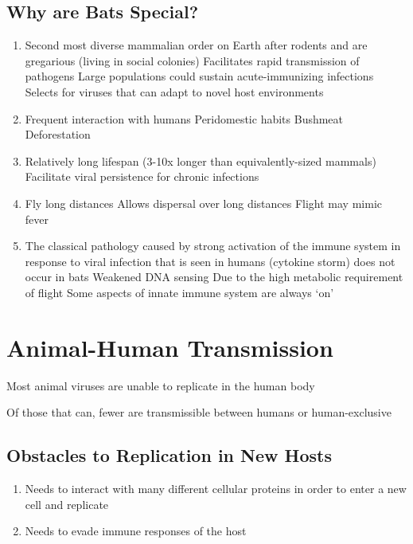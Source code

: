 \documentclass{notes}
\begin{document}
\subsection{Why are Bats Special?}

\begin{enumerate}
    \item Second most diverse mammalian order on Earth after rodents and are gregarious (living in social colonies)
    \subitem Facilitates rapid transmission of pathogens
    \subitem Large populations could sustain acute-immunizing infections
    \subitem Selects for viruses that can adapt to novel host environments
    \item Frequent interaction with humans
    \subitem Peridomestic habits
    \subitem Bushmeat
    \subitem Deforestation
    \item Relatively long lifespan (3-10x longer than equivalently-sized mammals)
    \subitem Facilitate viral persistence for chronic infections
    \item Fly long distances
    \subitem Allows dispersal over long distances
    \subitem Flight may mimic fever
    \item The classical pathology caused by strong activation of the immune system in response to viral infection that is seen in humans (cytokine storm) does not occur in bats
    \subitem Weakened DNA sensing
    \subsubitem Due to the high metabolic requirement of flight
    \subitem Some aspects of innate immune system are always `on'
\end{enumerate}

\section{Animal-Human Transmission}

Most animal viruses are unable to replicate in the human body

\tab \indicates Of those that can, fewer are transmissible between humans or human-exclusive

\subsection{Obstacles to Replication in New Hosts}

\begin{enumerate}
    \item Needs to interact with many different cellular proteins in order to enter a new cell and replicate
    \item Needs to evade immune responses of the host
\end{enumerate}
\end{document}
